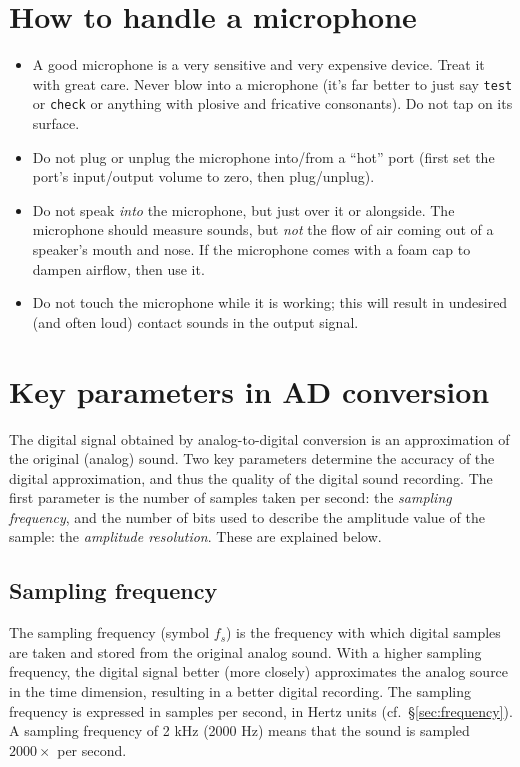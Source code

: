 \documentclass[
]{book}
\begin{document}
\label{mic-howto}
\section{How to handle a microphone}\label{sec:microphone}

\begin{itemize}
\item
  A good microphone is a very sensitive and very expensive device. Treat it with great care. Never blow into a microphone (it's far better to just say \texttt{test} or \texttt{check} or anything with plosive and fricative consonants). Do not tap on its surface.
\item
  Do not plug or unplug the microphone into/from a ``hot'' port (first set the port's input/output volume to zero, then plug/unplug).
\item
  Do not speak \emph{into} the microphone, but just over it or alongside. The microphone should measure sounds, but \emph{not} the flow of air coming out of a speaker's mouth and nose. If the microphone comes with a foam cap to dampen airflow, then use it.
\item
  Do not touch the microphone while it is working; this will result in undesired (and often loud) contact sounds in the output signal.
\end{itemize}

\section{Key parameters in AD conversion}\label{key-parameters-in-ad-conversion}

The digital signal obtained by analog-to-digital conversion is an approximation of the original (analog) sound. Two key parameters determine the accuracy of the digital approximation, and thus the quality of the digital sound recording. The first parameter is the number of samples taken per second: the \emph{sampling frequency}, and the number of bits used to describe the amplitude value of the sample: the \emph{amplitude resolution}. These are explained below.

\subsection{Sampling frequency}\label{sec:samplingfrequency}

The sampling frequency (symbol \(f_s\)) is the frequency with which digital samples are taken and stored from the original analog sound. With a higher sampling frequency, the digital signal better (more closely) approximates the analog source in the time dimension, resulting in a better digital recording. The sampling frequency is expressed in samples per second, in Hertz units (cf.~§\ref{sec:frequency}). A sampling frequency of 2 kHz (2000 Hz) means that the sound is sampled \(2000 \times\) per second.
\end{document}
